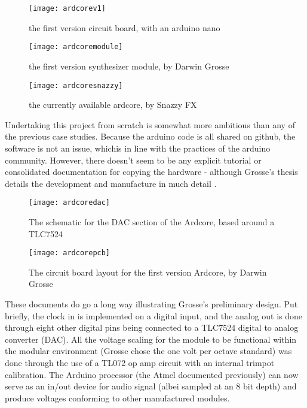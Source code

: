 	\citep{grosse2011}
		
		\begin{figure}[h!]
		  \caption{the first version circuit board, with an arduino nano}
		  \centering
		    \texttt{[image: ardcorev1]}
		\end{figure}
		
		\begin{figure}[h!]
		  \caption{the first version synthesizer module, by Darwin Grosse}
		  \centering
		    \texttt{[image: ardcoremodule]}
		\end{figure}
		
		\begin{figure}[h!]
		  \caption{the currently available ardcore, by Snazzy FX}
		  \centering
		    \texttt{[image: ardcoresnazzy]}
		\end{figure}

Undertaking this project from scratch is somewhat more ambitious than any of the previous case studies. Because the arduino code is all shared on github, the software is not an issue, whichis in line with the practices of the arduino community. However, there doesn't seem to be any explicit tutorial or consolidated documentation for copying the hardware - although Grosse's thesis details the development and manufacture in much detail \citep[pp.21-31]{grosse2011}. 

		\begin{figure}[h!]
		  \caption{The schematic for the DAC section of the Ardcore, based around a TLC7524}
		  \centering
		    \texttt{[image: ardcoredac]}
		\end{figure}
		
		\begin{figure}[h!]
		  \caption{The circuit board layout for the first version Ardcore, by Darwin Grosse}
		  \centering
		    \texttt{[image: ardcorepcb]}
		\end{figure}

These documents do go a long way illustrating Grosse's preliminary design. Put briefly, the clock in is implemented on a digital input, and the analog out is done through eight other digital pins being connected to a TLC7524 digital to analog converter (DAC). All the voltage scaling for the module to be functional within the modular environment (Grosse chose the one volt per octave standard) was done through the use of a TL072 op amp circuit with an internal trimpot calibration. The Arduino processor (the Atmel documented previously) can now serve as an in/out device for audio signal (albei sampled at an 8 bit depth) and produce voltages conforming to other manufactured modules. 

